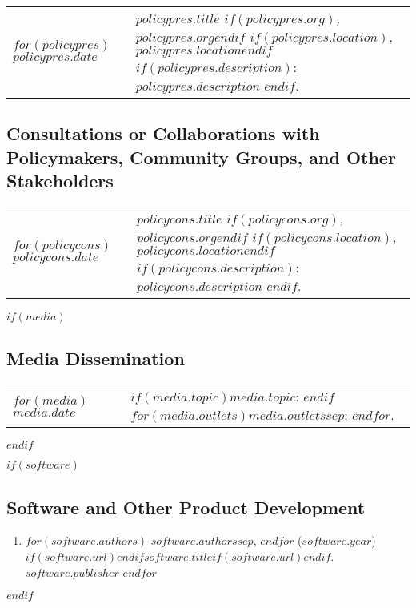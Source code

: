 \documentclass[12pt, martgin, line]{article}
\begin{document}
\setlength{\extrarowheight}{.75em}
\begin{longtable}[l]{lp{5in}}   
$for(policypres)$
$policypres.date$&
\parbox[t]{5in}{
    \textit{$policypres.title$%
    $if(policypres.org)$, $policypres.org$$endif$%
    $if(policypres.location)$, $policypres.location$$endif$}%
    $if(policypres.description)$: %
    $policypres.description$%
    $endif$.%
  }\\
$endfor$
\end{longtable}
\setlength{\extrarowheight}{0em}

\subsection*{Consultations or Collaborations with Policymakers, Community Groups, and Other Stakeholders}

\setlength{\extrarowheight}{.75em}
\begin{longtable}[l]{lp{5in}}   
$for(policycons)$
$policycons.date$&
\parbox[t]{5in}{
    \textit{$policycons.title$%
    $if(policycons.org)$, $policycons.org$$endif$%
    $if(policycons.location)$, $policycons.location$$endif$}%
    $if(policycons.description)$: %
    $policycons.description$%
    $endif$.%
  }\\
$endfor$
\end{longtable}
\setlength{\extrarowheight}{0em}


$if(media)$
\subsection*{Media Dissemination}
\setlength{\extrarowheight}{.75em}
\begin{longtable}[l]{lp{5in}}   
$for(media)$
$media.date$&
\parbox[t]{5in}{
   $if(media.topic)$$media.topic$: $endif$%
   $for(media.outlets)$$media.outlets$$sep$; $endfor$.%
 }\\
$endfor$
\end{longtable}
\setlength{\extrarowheight}{0em}
$endif$

$if(software)$
\subsection*{Software and Other Product Development}
\begin{enumerate}
  $for(software)$
  \item
  $for(software.authors)$
  $software.authors$$sep$,
  $endfor$
  ($software.year$)
  $if(software.url)$\href{$software.url$}{$endif$$software.title$$if(software.url)$}$endif$.
  $software.publisher$
  $endfor$
\end{enumerate}
$endif$
\end{document}
